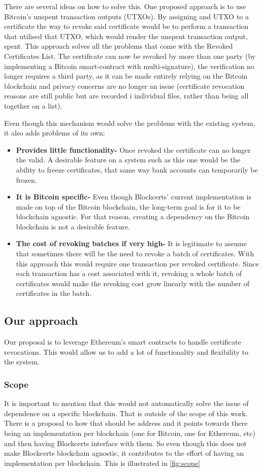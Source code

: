 \documentclass[llncsdoc]{llncs}
\begin{document}
There are several ideas on how to solve this. One proposed approach is to use Bitcoin's unspent transaction outputs (UTXOs). By assigning and UTXO to a certificate the way to revoke said certificate would be to perform a transaction that utilised that UTXO, which would render the unspent transaction output, spent. This approach solves all the problems that come with the Revoked Certificates List. The certificate can now be revoked by more than one party (by implementing a Bitcoin smart-contract with multi-signature), the verification no longer requires a third party, as it can be made entirely relying on the Bitcoin blockchain and privacy concerns are no longer an issue (certificate revocation reasons are still public but are recorded i individual files, rather than being all together on a list).

Even though this mechanism would solve the problems with the existing system, it also adds problems of its own:
\begin{itemize}
    \item \textbf{Provides little functionality-} Once revoked the certificate can no longer the valid. A desirable feature on a system such as this one would be the ability to freeze certificates, that same way bank accounts can temporarily be frozen.
    \item \textbf{It is Bitcoin specific-} Even though Blockcerts' current implementation is made on top of the Bitcoin blockchain, the long-term goal is for it to be blockchain agnostic. For that reason, creating a dependency on the Bitcoin blockchain is not a desirable feature.
    \item \textbf{The cost of revoking batches if very high-} It is legitimate to assume that sometimes there will be the need to revoke a batch of certificates. With this approach this would require one transaction per revoked certificate. Since each transaction has a cost associated with it, revoking a whole batch of certificates would make the revoking cost grow linearly with the number of certificates in the batch.
\end{itemize}

\subsection{Our approach}
Our proposal is to leverage Ethereum's smart contracts to handle certificate revocations. This would allow us to add a lot of functionality and flexibility to the system.
\subsubsection{Scope}
It is important to mention that this would not automatically solve the issue of dependence on a specific blockchain. That is outside of the scope of this work. There is a proposal to how that should be address and it points towards there being an implementation per blockchain (one for Bitcoin, one for Ethereum, etc) and then having Blockcerts interface with them. So even though this does not make Blockcerts blockchain agnostic, it contributes to the effort of having an implementation per blockchain. This is illustrated in \ref{fig:scope}
\end{document}
